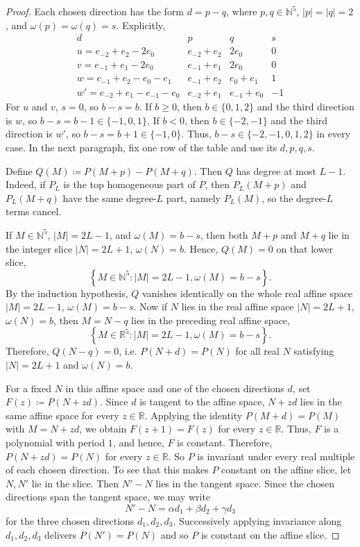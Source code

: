 \documentclass[10pt,a4paper]{amsart}
\newcommand{\N}{\mathbb N}
\newcommand{\R}{\mathbb R}
\begin{document}
\begin{proof}
Each chosen direction has the form \(d=p-q\), where \(p,q\in\mathbb N^5\), \(|p|=|q|=2\), and \(\omega(p)=\omega(q)=s\). Explicitly,
\[
\begin{array}{c|c|c|c}
d&p&q&s\\
\hline
u=e_{-2}+e_2-2e_0&e_{-2}+e_2&2e_0&0\\
v=e_{-1}+e_1-2e_0&e_{-1}+e_1&2e_0&0\\
w=e_{-1}+e_2-e_0-e_1&e_{-1}+e_2&e_0+e_1&1\\
w'=e_{-2}+e_1-e_{-1}-e_0&e_{-2}+e_1&e_{-1}+e_0&-1
\end{array}
\]
For \(u\) and \(v\), \(s=0\), so \(b-s=b\). If \(b\ge0\), then \(b\in\{0,1,2\}\) and the third direction is \(w\), so \(b-s=b-1\in\{-1,0,1\}\). If \(b<0\), then \(b\in\{-2,-1\}\) and the third direction is \(w'\), so \(b-s=b+1\in\{-1,0\}\). Thus, \(b-s\in\{-2,-1,0,1,2\}\) in every case. In the next paragraph, fix one row of the table and use its \(d,p,q,s\).

Define \(Q\left(M\right)\coloneqq P\left(M+p\right)-P\left(M+q\right)\). Then \(Q\) has degree at most \(L-1\). Indeed, if \(P_L\) is the top homogeneous part of \(P\), then \(P_L\left(M+p\right)\) and \(P_L\left(M+q\right)\) have the same degree-\(L\) part, namely \(P_L\left(M\right)\), so the degree-\(L\) terms cancel.

If \(M\in\N^5\), \(\lvert M\rvert=2L-1\), and \(\omega\left(M\right)=b-s\), then both \(M+p\) and \(M+q\) lie in the integer slice \(\lvert N\rvert=2L+1\), \(\omega\left(N\right)=b\). Hence, \(Q\left(M\right)=0\) on that lower slice,
\[\left\{M\in\N^5\colon\lvert M\rvert=2L-1,\omega\left(M\right)=b-s\right\}.\]
By the induction hypothesis, \(Q\) vanishes identically on the whole real affine space \(\lvert M\rvert=2L-1\), \(\omega\left(M\right)=b-s\). Now if \(N\) lies in the real affine space \(\lvert N\rvert=2L+1\), \(\omega\left(N\right)=b\), then \(M=N-q\) lies in the preceding real affine space, 
\[\left\{M\in\R^5\colon\lvert M\rvert=2L-1,\omega\left(M\right)=b-s\right\}.\] Therefore, \(Q\left(N-q\right)=0\), i.e. \(P\left(N+d\right)=P\left(N\right)\) for all real \(N\) satisfying \(\lvert N\rvert=2L+1\) and \(\omega\left(N\right)=b\).

For a fixed \(N\) in this affine space and one of the chosen directions \(d\), set \(F\left(z\right)\coloneqq P\left(N+zd\right)\). Since \(d\) is tangent to the affine space, \(N+zd\) lies in the same affine space for every \(z\in\R\). Applying the identity \(P\left(M+d\right)=P\left(M\right)\) with \(M=N+zd\), we obtain \(F\left(z+1\right)=F\left(z\right)\) for every \(z\in\R\). Thus, \(F\) is a polynomial with period \(1\), and hence, \(F\) is constant. Therefore, \(P\left(N+zd\right)=P\left(N\right)\) for every \(z\in\R\). So \(P\) is invariant under every real multiple of each chosen direction. To see that this makes \(P\) constant on the affine slice, let \(N,N'\) lie in the slice. Then \(N'-N\) lies in the tangent space. Since the chosen directions span the tangent space, we may write
\[
N'-N=\alpha d_1+\beta d_2+\gamma d_3
\]
for the three chosen directions \(d_1,d_2,d_3\). Successively applying invariance along \(d_1,d_2,d_3\) delivers \(P(N')=P(N)\) and so \(P\) is constant on the affine slice.


\end{proof}
\end{document}
